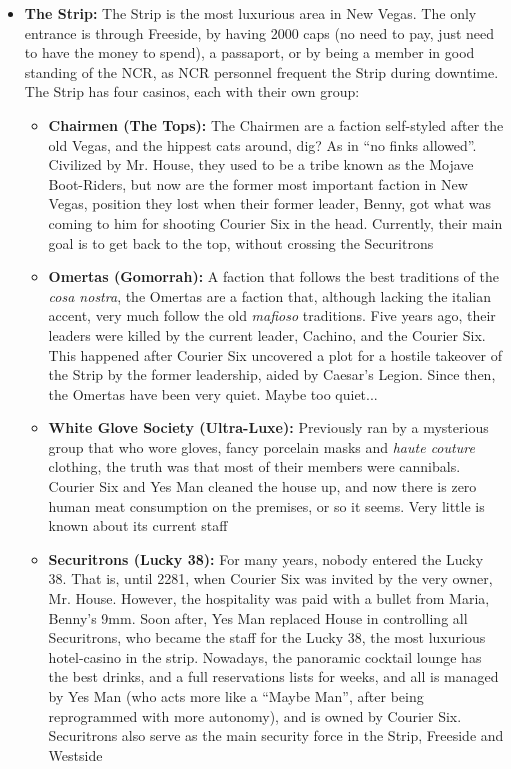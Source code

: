 \documentclass[11pt]{article} %
\begin{document}
\begin{itemize}
	\item \textbf{The Strip:} The Strip is the most luxurious area in New Vegas. The only entrance is through Freeside, by having 2000 caps (no need to pay, just need to have the money to spend), a passaport, or by being a member in good standing of the NCR, as NCR personnel frequent the Strip during downtime. The Strip has four casinos, each with their own group:
	\begin{itemize}
		\item \textbf{Chairmen (The Tops):} The Chairmen are a faction self-styled after the old Vegas, and the hippest cats around, dig? As in ``no finks allowed''. Civilized by Mr. House, they used to be a tribe known as the Mojave Boot-Riders, but now are the former most important faction in New Vegas, position they lost when their former leader, Benny, got what was coming to him for shooting Courier Six in the head. Currently, their main goal is to get back to the top, without crossing the Securitrons
		\item \textbf{Omertas (Gomorrah):} A faction that follows the best traditions of the \textit{cosa nostra}, the Omertas are a faction that, although lacking the italian accent, very much follow the old \textit{mafioso} traditions. Five years ago, their leaders were killed by the current leader, Cachino, and the Courier Six. This happened after Courier Six uncovered a plot for a hostile takeover of the Strip by the former leadership, aided by Caesar's Legion. Since then, the Omertas have been very quiet. Maybe too quiet...
		\item \textbf{White Glove Society (Ultra-Luxe):} Previously ran by a mysterious group that who wore gloves, fancy porcelain masks and \textit{haute couture} clothing, the truth was that most of their members were cannibals. Courier Six and Yes Man cleaned the house up, and now there is zero human meat consumption on the premises, or so it seems. Very little is known about its current staff
		\item \textbf{Securitrons (Lucky 38):} For many years, nobody entered the Lucky 38. That is, until 2281, when Courier Six was invited by the very owner, Mr. House. However, the hospitality was paid with a bullet from Maria, Benny's 9mm. Soon after, Yes Man replaced House in controlling all Securitrons, who became the staff for the Lucky 38, the most luxurious hotel-casino in the strip. Nowadays, the panoramic cocktail lounge has the best drinks, and a full reservations lists for weeks, and all is managed by Yes Man (who acts more like a ``Maybe Man'', after being reprogrammed with more autonomy), and is owned by Courier Six. Securitrons also serve as the main security force in the Strip, Freeside and Westside
	\end{itemize} 


\end{itemize}
\end{document}
